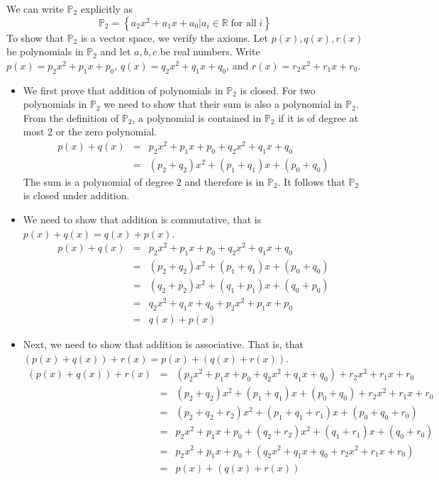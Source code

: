 \begin{solution}
We can write $\mathbb{P}_2$ explicitly as 
\[
\mathbb{P}_2 = \left\{ a_2x^2 + a_1x + a_0 | a_i \in \mathbb{R} \; \mbox{for all} \; i \right\}
\]
To show that $\mathbb{P}_2$ is a vector space, we verify the axioms. Let $p(x), q(x), r(x)$ be polynomials in $\mathbb{P}_2$ and let $a,b,c$ be real numbers. Write $p(x)=p_2x^2 + p_1x + p_0  $, $q(x)=q_2x^2 + q_1x + q_0  $, and $r(x)=r_2x^2 + r_1x + r_0$. 

\begin{itemize}
\item
We first prove that addition of polynomials in $\mathbb{P}_2$ is closed. For two polynomials in $\mathbb{P}_2$ we need to show that their sum is also a polynomial in $\mathbb{P}_2$. From the definition of $\mathbb{P}_2$, a polynomial is contained in $\mathbb{P}_2$ if it is of degree at most $2$ or the zero polynomial.
\begin{eqnarray*}
p(x) + q(x) &=& p_2x^2 + p_1x + p_0 + q_2x^2+ q_1x + q_0 \\
&=& (p_2+q_2)x^2 + (p_1+q_1)x + (p_0+q_0) 
\end{eqnarray*}
The sum is a polynomial of degree $2$ and therefore is in $\mathbb{P}_2$. It follows that $\mathbb{P}_2$ is closed under addition. 

\item
We need to show that addition is commutative, that is $p(x)+q(x) = q(x) + p(x)$.   
\begin{eqnarray*}
p(x) + q(x) &=&  p_2x^2 + p_1x + p_0 + q_2x^2 + q_1x + q_0\\
&=& (p_2+q_2)x^2 + (p_1+q_1)x + (p_0+q_0)  \\
&=&  (q_2+p_2)x^2 + (q_1+p_1)x + (q_0+p_0)  \\
&=& q_2x^2 + q_1x + q_0 + p_2x^2  + p_1x + p_0\\
&=& q(x) + p(x)
\end{eqnarray*}

\item
Next, we need to show that addition is associative. That is, that $(p(x) + q(x)) + r(x) = p(x) + (q(x)+r(x))$. 
\begin{eqnarray*}
(p(x) + q(x)) + r(x) &=& \left( p_2x^2 +p_1x + p_0 + q_2x^2 + q_1x + q_0 \right) + r_2x^2 +r_1x + r_0 \\
&=&  (p_2+q_2)x^2 + (p_1+q_1)x + (p_0 +q_0) + r_2x^2 + r_1x + r_0\\
&=&  (p_2+q_2+r_2)x^2 + (p_1+q_1+r_1)x + (p_0+q_0+r_0)  \\
&=&  p_2x^2 + p_1x + p_0 +  (q_2+r_2)x^2 + (q_1+r_1)x + (q_0+r_0)  \\
&=&  p_2x^2 + p_1x + p_0 + \left(  q_2x^2 +q_1x + q_0 + r_2x^2 + r_1x + r_0 \right)\\
&=& p(x) + \left( q(x) + r(x) \right)
\end{eqnarray*}


\end{itemize}
\end{solution}
